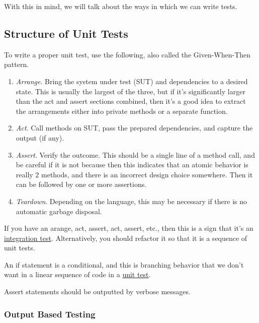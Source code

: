   With this in mind, we will talk about the ways in which we can write tests. 

\subsection{Structure of Unit Tests}

  To write a proper unit test, use the following, also called the Given-When-Then pattern. 
  \begin{enumerate}
    \item \textit{Arrange}. Bring the system under test (SUT) and dependencies to a desired state. This is usually the largest of the three, but if it's significantly larger than the act and assert sections combined, then it's a good idea to extract the arrangements either into private methods or a separate function. 
    \item \textit{Act}. Call methods on SUT, pass the prepared dependencies, and capture the output (if any). 
    \item \textit{Assert}. Verify the outcome. This should be a single line of a method call, and be careful if it is not because then this indicates that an atomic behavior is really 2 methods, and there is an incorrect design choice somewhere. Then it can be followed by one or more assertions. 
    \item \textit{Teardown}. Depending on the language, this may be necessary if there is no automatic garbage disposal. 
  \end{enumerate}

  If you have an arange, act, assert, act, assert, etc., then this is a sign that it's an \hyperref[def:integration-test]{integration test}. Alternatively, you should refactor it so that it is a sequence of unit tests. 

  \begin{theorem}
    \label{thm:avoid-if-statements-in-tests}
    An if statement is a conditional, and this is branching behavior that we don't want in a linear sequence of code in a \hyperref[def:unit-test]{unit test}. 
  \end{theorem}  

  Assert statements should be outputted by verbose messages. 

\subsubsection{Output Based Testing}


